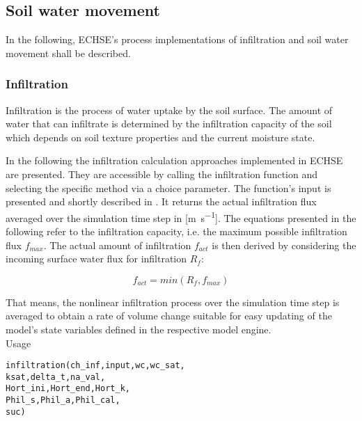 \subsection{Soil water movement}
In the following, ECHSE's process implementations of infiltration and soil water movement shall be described.


\subsubsection{Infiltration} \label{sec:rungen:inf}
Infiltration is the process of water uptake by the soil surface. The amount of water that can infiltrate is determined by the infiltration capacity of the soil which depends on soil texture properties and the current moisture state.

In the following the infiltration calculation approaches implemented in ECHSE are presented. They are accessible by calling the infiltration function and selecting the specific method via a choice parameter. The function's input is presented and shortly described in . It returns the actual infiltration flux averaged over the simulation time step in [\si{\metre\per\second}]. The equations presented in the following refer to the infiltration capacity, i.e. the maximum possible infiltration flux $f_{max}$. The actual amount of infiltration $f_{act}$ is then derived by considering the incoming surface water flux for infiltration $R_f$:

\begin{equation}
f_{act} = min(R_f, f_{max})
\end{equation}

That means, the nonlinear infiltration process over the simulation time step is averaged to obtain a rate of volume change suitable for easy updating of the model's state variables defined in the respective model engine.\\

\noindent
Usage
\begin{verbatim}
infiltration(ch_inf,input,wc,wc_sat,
ksat,delta_t,na_val,
Hort_ini,Hort_end,Hort_k,
Phil_s,Phil_a,Phil_cal,
suc)
\end{verbatim}

